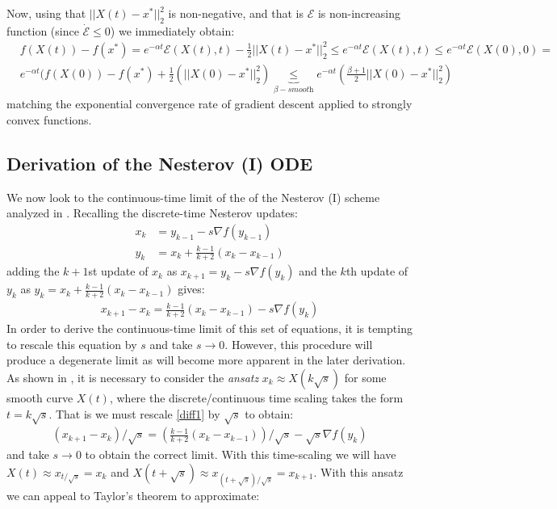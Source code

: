 Now, using that $||X(t)-x^*||_2^2$ is non-negative, and that is $\mathcal{E}$ is non-increasing function (since $\dot{\mathcal{E}} \leq 0$) we immediately obtain:
\begin{align*}
    & f(X(t)) - f(x^*) = e^{-\alpha t} \mathcal{E}(X(t), t) - \frac{1}{2} ||X(t) - x^*||_2^2 \leq e^{-\alpha t} \mathcal{E}(X(t), t) \leq e^{-\alpha t} \mathcal{E}(X(0), 0) = \\
    & e^{-\alpha t} (f(X(0))-f(x^*)+\frac{1}{2}(||X(0)-x^*||_2^2) \underbrace{\leq}_{\beta-\textit{smooth}} e^{-\alpha t} \left( \frac{\beta+1}{2} ||X(0) - x^*||_2^2 \right) 
\end{align*}
matching the exponential convergence rate of gradient descent applied to strongly convex functions.

\subsection{Derivation of the Nesterov (I) ODE}
We now look to the continuous-time limit of the of the Nesterov (I) scheme analyzed in \cite{su2014differential}. Recalling the discrete-time Nesterov updates:
\begin{align}
    x_k &= y_{k-1} - s \nabla f(y_{k-1})\\
    y_k &= x_k + \frac{k-1}{k+2} (x_k - x_{k-1}) \label{nesterov}
\end{align}
adding the $k+1$st update of $x_k$ as $x_{k+1} = y_k - s \nabla f(y_k)$ and the $k$th update of $y_k$ as $y_k = x_k + \frac{k-1}{k+2}(x_k-x_{k-1})$ gives:
\begin{align}
    x_{k+1} - x_{k} = \frac{k-1}{k+2}(x_{k}-x_{k-1}) - s \nabla f(y_k) \label{diff1}
\end{align}
In order to derive the continuous-time limit of this set of equations, it is tempting to rescale this equation by $s$ and take $s \to 0$. However, this procedure will produce a degenerate limit as will become more apparent in the later derivation. As shown in \cite{su2014differential}, it is necessary to consider the \textit{ansatz} $x_k \approx X(k \sqrt{s})$ for some smooth curve $X(t)$, where the discrete/continuous time scaling takes the form $t = k \sqrt{s}$. That is we must rescale \eqref{diff1} by $\sqrt{s}$ to obtain:
\begin{align}
    (x_{k+1} - x_{k})/\sqrt{s} = \left(\frac{k-1}{k+2}(x_{k}-x_{k-1}) \right)/\sqrt{s} - \sqrt{s} \nabla f(y_k) \label{diff2}
\end{align}
and take $s \to 0$ to obtain the correct limit. With this time-scaling we will have $X(t) \approx x_{t/\sqrt{s}} = x_k$ and $X(t+ \sqrt{s}) \approx x_{(t+\sqrt{s})/\sqrt{s}} = x_{k+1}$. With this ansatz we can appeal to Taylor's theorem to approximate:
